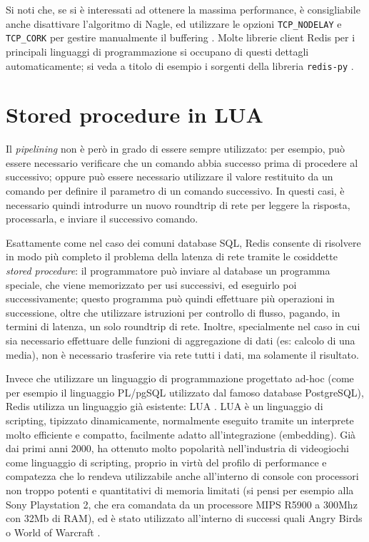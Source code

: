 Si noti che, se si è interessati ad ottenere la massima performance, è consigliabile anche
disattivare l'algoritmo di Nagle, ed utilizzare le opzioni \verb|TCP_NODELAY| e \verb|TCP_CORK| per
gestire manualmente il buffering \cite{tcp-cork}. Molte librerie client Redis per i principali
linguaggi di programmazione si occupano di questi dettagli automaticamente; si veda a titolo di
esempio i sorgenti della libreria \verb|redis-py| \cite{tcp-cork-redispy}.

\section{Stored procedure in LUA}

Il \emph{pipelining} non è però in grado di essere sempre utilizzato: per esempio, può essere
necessario verificare che un comando abbia successo prima di procedere al successivo; oppure
può essere necessario utilizzare il valore restituito da un comando per definire il parametro 
di un comando successivo. In questi casi, è necessario quindi introdurre un nuovo roundtrip di
rete per leggere la risposta, processarla, e inviare il successivo comando.

Esattamente come nel caso dei comuni database SQL, Redis consente di risolvere in modo più completo
il problema della latenza di rete tramite le cosiddette \emph{stored procedure}: il programmatore
può inviare al database un programma speciale, che viene memorizzato per usi successivi, ed
eseguirlo poi successivamente; questo programma può quindi effettuare più operazioni in successione,
oltre che utilizzare istruzioni per controllo di flusso, pagando, in termini di latenza, un solo
roundtrip di rete. Inoltre, specialmente nel caso in cui sia necessario effettuare delle funzioni di
aggregazione di dati (es: calcolo di una media), non è necessario trasferire via rete tutti i dati,
ma solamente il risultato.

Invece che utilizzare un linguaggio di programmazione progettato ad-hoc (come per esempio il
linguaggio PL/pgSQL \cite{plpgsql} utilizzato dal famoso database PostgreSQL), Redis utilizza un
linguaggio già esistente: LUA \cite{lua}. LUA è un linguaggio di scripting, tipizzato dinamicamente,
normalmente eseguito tramite un interprete molto efficiente e compatto, facilmente adatto
all'integrazione (embedding). Già dai primi anni 2000, ha ottenuto molto popolarità nell'industria
di videogiochi come linguaggio di scripting, proprio in virtù del profilo di performance e
compatezza che lo rendeva utilizzabile anche all'interno di console con processori non troppo
potenti e quantitativi di memoria limitati (si pensi per esempio alla Sony Playstation 2, che era
comandata da un processore MIPS R5900 a 300Mhz con 32Mb di RAM), ed è stato utilizzato all'interno
di successi quali Angry Birds \cite{lua-angry} o World of Warcraft \cite{lua-wow}.

